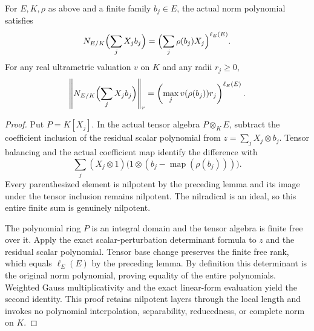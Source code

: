 \begin{theorem}
\label{spectrum:algclosed-local-norm-form}
\leanok
{}
For $E,K,\rho$ as above and a finite family $b_j\in E$, the actual
norm polynomial satisfies
\[
 N_{E/K}\Bigl(\sum_j X_jb_j\Bigr)
 =\Bigl(\sum_j\rho(b_j)X_j\Bigr)^{\ell_E(E)}.
\]
For any real ultrametric valuation $v$ on $K$ and any radii $r_j\ge0$,
\[
 \left\|N_{E/K}\Bigl(\sum_j X_jb_j\Bigr)\right\|_r
 =\left(\max_jv(\rho(b_j))r_j\right)^{\ell_E(E)}.
\]
\end{theorem}
\begin{proof}
Put $P=K[X_j]$. In the actual tensor algebra $P\otimes_K E$, subtract
the coefficient inclusion of the residual scalar polynomial from
$z=\sum_jX_j\otimes b_j$. Tensor balancing and the actual coefficient
map identify the difference with
\[
 \sum_j (X_j\otimes1)
       \bigl(1\otimes(b_j-\operatorname{map}(\rho(b_j)))\bigr).
\]
Every parenthesized element is nilpotent by the preceding lemma and
its image under the tensor inclusion remains nilpotent. The nilradical
is an ideal, so this entire finite sum is genuinely nilpotent.

The polynomial ring $P$ is an integral domain and the tensor algebra
is finite free over it. Apply the exact scalar-perturbation determinant
formula to $z$ and the residual scalar polynomial. Tensor base change
preserves the finite free rank, which equals $\ell_E(E)$ by the preceding
lemma. By definition this determinant is the original norm polynomial,
proving equality of the entire polynomials. Weighted Gauss
multiplicativity and the exact linear-form evaluation yield the
second identity. This proof retains nilpotent layers through the
local length and invokes no polynomial interpolation, separability,
reducedness, or complete norm on $K$.
\end{proof}
